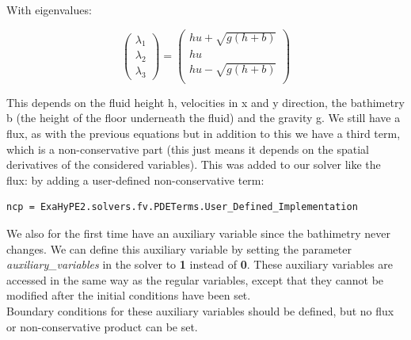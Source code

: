 \documentclass[12pt,letterpaper]{article}
\begin{document}
With eigenvalues:

\begin{equation*}
    \left(
    \begin{array}{lr}
        \lambda_1 \\
        \lambda_2 \\
        \lambda_3 
    \end{array} \right) =
    \left(
    \begin{array}{lr}
        h u + \sqrt{g (h+b)} \\
        h u \\
        h u - \sqrt{g (h+b)} \\
    \end{array} \right)
\end{equation*}

This depends on the fluid height h, velocities in x and y direction, the bathimetry b (the height of the floor underneath the fluid) and the gravity g. We still have a flux, as with the previous equations but in addition to this we have a third term, which is a non-conservative part (this just means it depends on the spatial derivatives of the considered variables). This was added to our solver like the flux: by adding a user-defined non-conservative term:

\begin{lstlisting}[style = Python]
  ncp = ExaHyPE2.solvers.fv.PDETerms.User_Defined_Implementation
\end{lstlisting}

We also for the first time have an auxiliary variable since the bathimetry never changes. We can define this auxiliary variable by setting the parameter \textit{auxiliary\_variables} in the solver to \textbf{1} instead of \textbf{0}. These auxiliary variables are accessed in the same way as the regular variables, except that they cannot be modified after the initial conditions have been set.\\
Boundary conditions for these auxiliary variables should be defined, but no flux or non-conservative product can be set.
\end{document}
